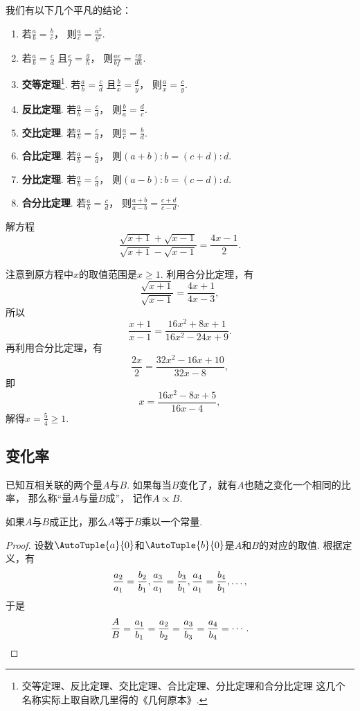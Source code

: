 我们有以下几个平凡的结论：\begin{enumerate}
	\item 若\(\frac{a}{b} = \frac{b}{c}\)，
	则\(\frac{a}{c} = \frac{a^2}{b^2}\).
	\item 若\(\frac{a}{b} = \frac{c}{d}\)
	且\(\frac{e}{f} = \frac{g}{h}\)，
	则\(\frac{ae}{bf} = \frac{cg}{dh}\).
	\item {\rm\bf 交等定理}\footnote{%
	交等定理、反比定理、交比定理、合比定理、分比定理和合分比定理
	这几个名称实际上取自欧几里得的《几何原本》.%
	}.
	若\(\frac{a}{b} = \frac{c}{d}\)
	且\(\frac{b}{x} = \frac{d}{y}\)，
	则\(\frac{a}{x} = \frac{c}{y}\).
	\item {\rm\bf 反比定理}.
	若\(\frac{a}{b} = \frac{c}{d}\)，
	则\(\frac{b}{a} = \frac{d}{c}\).
	\item {\rm\bf 交比定理}.
	若\(\frac{a}{b} = \frac{c}{d}\)，
	则\(\frac{a}{c} = \frac{b}{d}\).
	\item {\rm\bf 合比定理}.
	若\(\frac{a}{b} = \frac{c}{d}\)，
	则\((a+b):b = (c+d):d\).
	\item {\rm\bf 分比定理}.
	若\(\frac{a}{b} = \frac{c}{d}\)，
	则\((a-b):b = (c-d):d\).
	\item {\rm\bf 合分比定理}.
	若\(\frac{a}{b} = \frac{c}{d}\)，
	则\(\frac{a+b}{a-b} = \frac{c+d}{c-d}\).
\end{enumerate}

\begin{example}
解方程\[
	\frac{\sqrt{x+1}+\sqrt{x-1}}{\sqrt{x+1}-\sqrt{x-1}} = \frac{4x-1}{2}.
\]
\begin{solution}
注意到原方程中\(x\)的取值范围是\(x\geq1\).
利用合分比定理，有\[
	\frac{\sqrt{x+1}}{\sqrt{x-1}} = \frac{4x+1}{4x-3},
\]
所以\[
	\frac{x+1}{x-1} = \frac{16x^2+8x+1}{16x^2-24x+9}.
\]
再利用合分比定理，有\[
	\frac{2x}{2} = \frac{32x^2-16x+10}{32x-8},
\]
即\[
	x = \frac{16x^2-8x+5}{16x-4},
\]
解得\(x=\frac{5}{4} \geq1\).
\end{solution}
\end{example}

\subsection{变化率}
\begin{definition}
已知互相关联的两个量\(A\)与\(B\).
如果每当\(B\)变化了，就有\(A\)也随之变化一个相同的比率，
那么称“量\(A\)与量\(B\)成”，
记作\(A \propto B\).
\end{definition}

\begin{theorem}
如果\(A\)与\(B\)成正比，那么\(A\)等于\(B\)乘以一个常量.
\begin{proof}
设数\(\AutoTuple{a}{0}\)和\(\AutoTuple{b}{0}\)是\(A\)和\(B\)的对应的取值.
根据定义，有\[
	\def\f#1{%
		\frac{a_#1}{a_1} = \frac{b_#1}{b_1}%
	}
	\f2,\f3,\f4,\dotsc,
\]
于是\[
	\def\f#1{\frac{a_#1}{b_#1}}
	\frac{A}{B} = \f1 = \f2 = \f3 = \f4 = \dotsb.
	\qedhere
\]
\end{proof}
\end{theorem}

